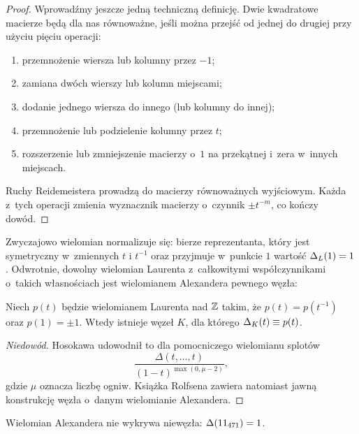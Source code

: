 \begin{proof}
    Wprowadźmy jeszcze jedną techniczną definicję.
    Dwie kwadratowe macierze będą dla nas równoważne, jeśli można przejść od jednej do drugiej przy użyciu pięciu operacji:
    \begin{enumerate}
        \item przemnożenie wiersza lub kolumny przez $-1$;
        \item zamiana dwóch wierszy lub kolumn miejscami;
        \item dodanie jednego wiersza do innego (lub kolumny do innej);
        \item przemnożenie lub podzielenie kolumny przez $t$;
        \item rozszerzenie lub zmniejszenie macierzy o~$1$ na przekątnej i~zera w~innych miejscach.
    \end{enumerate}

    Ruchy Reidemeistera prowadzą do macierzy równoważnych wyjściowym.
    Każda z~tych operacji zmienia wyznacznik macierzy o~czynnik $\pm t^{-m}$, co kończy dowód.
\end{proof}

Zwyczajowo wielomian normalizuje się: bierze reprezentanta, który jest symetryczny w~zmiennych $t$ i $t^{-1}$ oraz przyjmuje w~punkcie $1$ wartość $\Delta_L(1) = 1$.
Odwrotnie, dowolny wielomian Laurenta z~całkowitymi współczynnikami o~takich własnościach jest wielomianem Alexandera pewnego węzła:

\begin{proposition}
\label{prp:alexander_hosokawa}%
    Niech $p(t)$ będzie wielomianem Laurenta nad $\mathbb Z$ takim, że $p(t) = p(t^{-1})$ oraz $p(1) = \pm 1$.
    Wtedy istnieje węzeł $K$, dla którego $\Delta_K(t) \equiv p(t)$.
\end{proposition}

\begin{proof}[Niedowód]
%
    Hosokawa \cite{hosokawa1958} udowodnił to dla pomocniczego wielomianu splotów
    \begin{equation}
        \frac{\Delta(t, \ldots, t)}{(1-t)^{\max(0, \mu - 2)}},
    \end{equation}
    gdzie $\mu$ oznacza liczbę ogniw.
    Książka Rolfsena \cite[s. 171-172]{rolfsen1976} zawiera natomiast jawną konstrukcję węzła o~danym wielomianie Alexandera.
\end{proof}

\begin{example}
\label{alexander_no_detects_unknot}%
    Wielomian Alexandera nie wykrywa niewęzła:
    $\Delta(11_{471}) = 1$.
\end{example}

